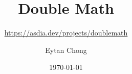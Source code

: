 \documentclass[a4paper,listof=totoc,openany]{scrbook}
\title{Double Math}
\subtitle{\url{https://asdia.dev/projects/doublemath}}
\author{Eytan Chong}
\date{\today}
\begin{document}
\maketitle

\frontmatter



\cleardoubleemptypage

\tableofcontents

\mainmatter



\end{document}
